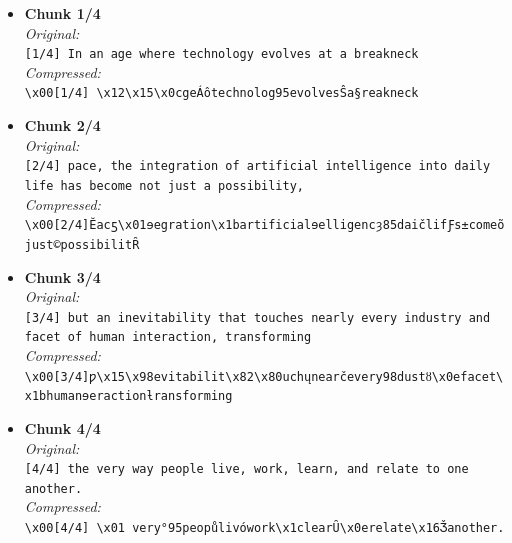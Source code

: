 \documentclass[12pt,openany]{article}
\theoremstyle{definition}
\theoremstyle{definition}
\theoremstyle{definition}
\begin{document}
\begin{itemize}
    \item \textbf{Chunk 1/4} \\
    \textit{Original:} \\
    \texttt{[1/4] In an age where technology evolves at a breakneck} \\
    \textit{Compressed:} \\
    \texttt{\textbackslash x00[1/4] \textbackslash x12\textbackslash x15\textbackslash x0cgeÁôtechnolog\x95evolvesŜa§reakneck}
    
    \vspace{0.5em}
    \item \textbf{Chunk 2/4} \\
    \textit{Original:} \\
    \texttt{[2/4] pace, the integration of artificial intelligence into daily life has become not just a possibility,} \\
    \textit{Compressed:} \\
    \texttt{\textbackslash x00[2/4]Ĕacƽ\textbackslash x01ɘegration\textbackslash x1bartificialɘelligencȝ\x85daičlifƑs±comeõ just©possibilitȒ}
    
    \vspace{0.5em}
    \item \textbf{Chunk 3/4} \\
    \textit{Original:} \\
    \texttt{[3/4] but an inevitability that touches nearly every industry and facet of human interaction, transforming} \\
    \textit{Compressed:} \\
    \texttt{\textbackslash x00[3/4]ƿ\textbackslash x15\textbackslash x98evitabilit\textbackslash x82\textbackslash x80uchųnearčevery\x98dustȣ\textbackslash x0efacet\textbackslash \\x1bhumanɘeractionƚransforming}
    
    \vspace{0.5em}
    \item \textbf{Chunk 4/4} \\
    \textit{Original:} \\
    \texttt{[4/4] the very way people live, work, learn, and relate to one another.} \\
    \textit{Compressed:} \\
    \texttt{\textbackslash x00[4/4] \textbackslash x01 very°\x95peopůlivówork\textbackslash x1clearȖ\textbackslash x0erelate\textbackslash x16Ǯanother.}
\end{itemize}
\end{document}
